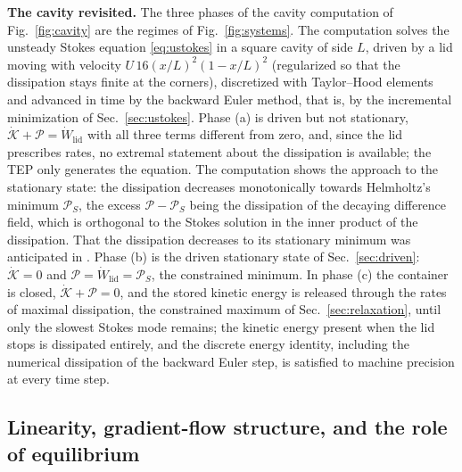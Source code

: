\documentclass[aip,pof,reprint,amsmath,amssymb,longbibliography]{revtex4-2}
\begin{document}
\textbf{The cavity revisited.} The three phases of the cavity computation of Fig.~\ref{fig:cavity} are the regimes of Fig.~\ref{fig:systems}. The computation solves the unsteady Stokes equation \eqref{eq:ustokes} in a square cavity of side $L$, driven by a lid moving with velocity $U\,16(x/L)^2(1-x/L)^2$ (regularized so that the dissipation stays finite at the corners), discretized with Taylor--Hood elements and advanced in time by the backward Euler method, that is, by the incremental minimization of Sec.~\ref{sec:ustokes}. Phase (a) is driven but not stationary, $\dot{\mathcal{K}} + \mathcal{P} = \dot{W}_{\mathrm{lid}}$ with all three terms different from zero, and, since the lid prescribes rates, no extremal statement about the dissipation is available; the TEP only generates the equation. The computation shows the approach to the stationary state: the dissipation decreases monotonically towards Helmholtz's minimum $\mathcal{P}_S$, the excess $\mathcal{P} - \mathcal{P}_S$ being the dissipation of the decaying difference field, which is orthogonal to the Stokes solution in the inner product of the dissipation. That the dissipation decreases to its stationary minimum was anticipated in \cite{struchtrup1998, svoboda2023note}. Phase (b) is the driven stationary state of Sec.~\ref{sec:driven}: $\dot{\mathcal{K}} = 0$ and $\mathcal{P} = \dot{W}_{\mathrm{lid}} = \mathcal{P}_S$, the constrained minimum. In phase (c) the container is closed, $\dot{\mathcal{K}} + \mathcal{P} = 0$, and the stored kinetic energy is released through the rates of maximal dissipation, the constrained maximum of Sec.~\ref{sec:relaxation}, until only the slowest Stokes mode remains; the kinetic energy present when the lid stops is dissipated entirely, and the discrete energy identity, including the numerical dissipation of the backward Euler step, is satisfied to machine precision at every time step.


\subsection{Linearity, gradient-flow structure, and the role of equilibrium}
\label{sec:linearity}
\end{document}
